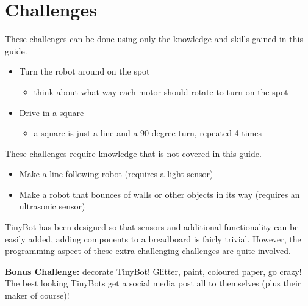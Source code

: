 \documentclass[a4paper,12pt]{article}
\begin{document}
\pagebreak


\pagebreak


% 



\pagebreak


\pagebreak
\section{Challenges} \label{sec:challenges}

These challenges can be done using only the knowledge and skills gained in this guide. 
\begin{itemize}
    \item Turn the robot around on the spot
    \begin{itemize}
      \item think about what way each motor should rotate to turn on the spot
    \end{itemize} 
    \item Drive in a square 
    \begin{itemize}
      \item a square is just a line and a 90 degree turn, repeated 4 times
    \end{itemize}
\end{itemize}

\bigskip


These challenges require knowledge that is not covered in this guide.
\begin{itemize}
    \item Make a line following robot (requires a light sensor)
    \item Make a robot that bounces of walls or other objects in its way (requires an ultrasonic sensor)
\end{itemize}
TinyBot has been designed so that sensors and additional functionality can be easily added, adding components to a breadboard is fairly trivial. However, the programming aspect of these extra challenging challenges are quite involved.

\bigskip

\textbf{Bonus Challenge:} decorate TinyBot! Glitter, paint, coloured paper, go crazy! The best looking TinyBots get a social media post all to themselves (plus their maker of course)!

\appendix
% 
\end{document}
